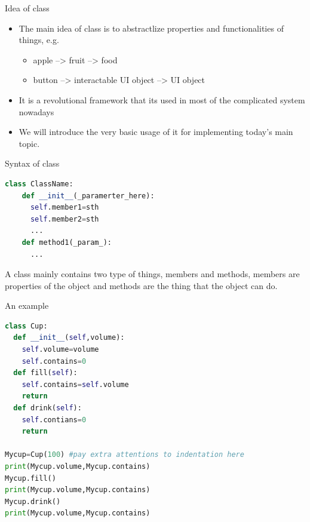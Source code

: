 \documentclass[10pt,xcolor={table,dvipsnames},t]{beamer}
\begin{document}
\begin{frame}{Idea of class}
  \begin{itemize}
    \item The main idea of class is to abstractlize properties and functionalities of things, e.g.
    \begin{itemize}
      \item apple --> fruit --> food
      \item button --> interactable UI object --> UI object
    \end{itemize}
    \item It is a revolutional framework that its used in most of the complicated system nowadays 
    \item We will introduce the very basic usage of it for implementing today's main topic.
  \end{itemize}
\end{frame}

\begin{frame}[fragile]{Syntax of class}
\begin{lstlisting}[language=python]
  class ClassName:
    def __init__(_paramerter_here):
      self.member1=sth
      self.member2=sth
      ...
    def method1(_param_):
      ...
\end{lstlisting}
A class mainly contains two type of things, members and methods, members are properties of the object and methods are the thing that the object can do.
\end{frame}

\begin{frame}[fragile]{An example}
\begin{lstlisting}[language=python]
class Cup:
  def __init__(self,volume):
    self.volume=volume
    self.contains=0
  def fill(self):
    self.contains=self.volume
    return
  def drink(self):
    self.contians=0
    return

Mycup=Cup(100) #pay extra attentions to indentation here
print(Mycup.volume,Mycup.contains)
Mycup.fill()
print(Mycup.volume,Mycup.contains)
Mycup.drink()
print(Mycup.volume,Mycup.contains)
\end{lstlisting}
\end{frame}
\end{document}
